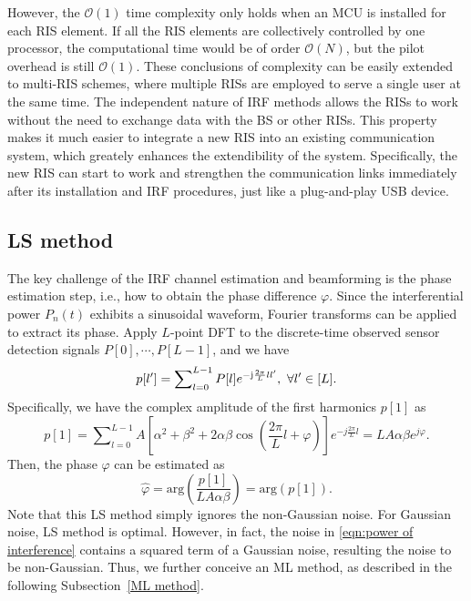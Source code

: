 \documentclass[12pt,draftclsnofoot,journal,onecolumn]{IEEEtran}
\theoremstyle{nonumberplain}
\def \arg {\text{arg}}
\begin{document}
    However, the $\mathcal{O}(1)$ time complexity only holds when an MCU is installed for each RIS element. If all the RIS elements are collectively controlled by one processor, the computational time would be of order $\mathcal{O}(N)$, but the pilot overhead is still $\mathcal{O}(1)$. These conclusions of complexity can be easily extended to multi-RIS schemes, where multiple RISs are employed to serve a single user at the same time. The independent nature of IRF methods allows the RISs to work without the need to exchange data with the BS or other RISs. This property makes it much easier to integrate a new RIS into an existing communication system, which greately enhances the extendibility of the system. Specifically, the new RIS can start to work and strengthen the communication links immediately after its installation and IRF procedures, just like a plug-and-play USB device. 

\subsection{LS method}  \label{LS method}
    The key challenge of the IRF channel estimation and beamforming is the phase estimation step, i.e., how to obtain the phase difference $\varphi$. Since the interferential power $P_n(t)$ exhibits a sinusoidal waveform, Fourier transforms can be applied to extract its phase. Apply $L$-point \ac{DFT} to the discrete-time  observed sensor detection signals $P[0],\cdots ,P[L-1]$, and we have
    \begin{equation}
        \label{DFT}
        p[l']=\sum\nolimits_{l=0}^{L-1}P[l]e^{-{\rm j}\frac{2\pi}{L}ll'},~\forall l'\in [L].
    \end{equation}
    Specifically, we have the complex amplitude of the first harmonics $p[1]$ as 
    \begin{equation}
        \label{DFT l=1}
        p[1]=\sum\nolimits_{l=0}^{L-1}A\left[\alpha^{2}+\beta^{2}+2\alpha\beta\cos\left(\frac{2\pi}{L}l+\varphi\right)\right]e^{-j\frac{2\pi}{L}l}=LA\alpha\beta  e^{j\varphi}.
    \end{equation}
    Then, the phase $\varphi$ can be estimated as
    \begin{equation}
        \label{LS estimate result}
        \hat{\varphi}=\arg\left(\frac{p[1]}{LA\alpha\beta}\right) = \arg\left(p[1]\right).
    \end{equation}
    Note that this LS method simply ignores the non-Gaussian noise. For Gaussian noise, LS method is optimal. However, in fact, the noise in \eqref{eqn:power of interference} contains a squared term of a Gaussian noise, resulting the noise to be non-Gaussian. Thus, we further conceive an ML method, as described in the following Subsection~\ref{ML method}. 
\end{document}
